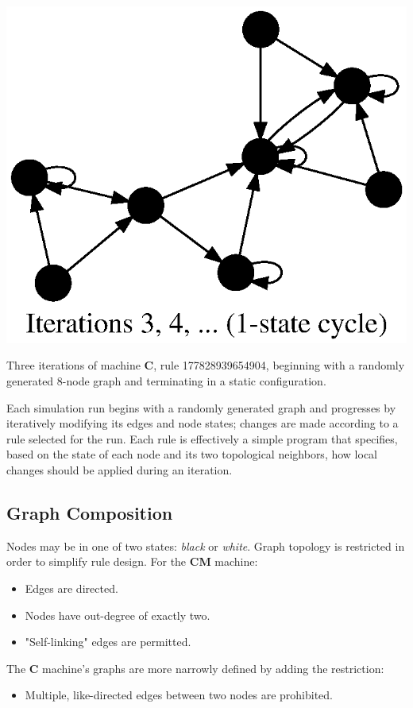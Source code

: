 \documentclass{tufte-handout}
\begin{document}
\begin{marginfigure}
\hspace{-4em}
\includegraphics{5iters_3.ps}
\caption{Three iterations of machine \textbf{C}, rule 177828939654904,
beginning with a randomly generated 8-node graph and terminating in a
static configuration.}
\end{marginfigure}

Each simulation run begins with a randomly generated graph and progresses by
iteratively modifying its edges and node states; changes are made according to a rule selected
for the run. Each rule is effectively a simple program  that specifies, based on the state
of each node and its two topological neighbors, how local changes should be applied during an
iteration.

\subsection{Graph Composition}

Nodes may be in one of two states: \textit{black} or \textit{white}.
Graph topology is restricted in order to simplify rule design. For the
\textbf{CM} machine:

\vspace{1mm}
\begin{itemize}
\setlength{\itemindent}{2em}
    \item Edges are directed.
    \item Nodes have out-degree of exactly two.
    \item "Self-linking" edges are permitted.
\end{itemize}
\vspace{2mm}
The \textbf{C}  machine's graphs are more narrowly defined by adding the
restriction:
\begin{itemize} 
\setlength{\itemindent}{2em}
    \item Multiple, like-directed edges between two nodes are prohibited.
\end{itemize}
\vspace{2mm}
\end{document}
